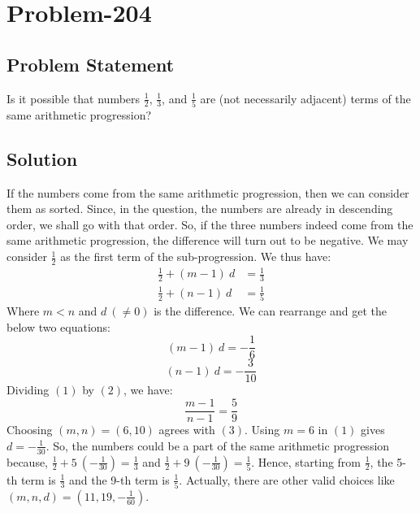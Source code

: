 \documentclass[12pt]{article}
\begin{document}
\section*{Problem-204}
\subsection*{Problem Statement}
Is it possible that numbers $\frac{1}{2}$, $\frac{1}{3}$, and $\frac{1}{5}$ are (not necessarily adjacent) terms of the same arithmetic progression?

\subsection*{Solution}
If the numbers come from the same arithmetic progression, then we can consider them as sorted. Since, in the question, the numbers are already in descending order, we shall go with that order. So, if the three numbers indeed come from the same arithmetic progression, the difference will turn out to be negative. We may consider $\frac{1}{2}$ as the first term of the sub-progression. We thus have:
\begin{equation*}
\begin{aligned}
\frac{1}{2} + (m-1)\ d &= \frac{1}{3}\\
\frac{1}{2} + (n-1)\ d &= \frac{1}{5}
\end{aligned}
\end{equation*}
Where $m < n$ and $d\ (\neq 0)$ is the difference. We can rearrange and get the below two equations:
\begin{equation}
		(m-1)\ d = -\frac{1}{6}	
\end{equation}
\begin{equation}
		(n-1)\ d = -\frac{3}{10}	
\end{equation}
Dividing $(1)$ by $(2)$, we have:
\begin{equation}
	\frac{m-1}{n-1} = \frac{5}{9}
\end{equation}
Choosing $(m, n) = (6, 10)$ agrees with $(3)$. Using $m=6$ in $(1)$ gives $d = -\frac{1}{30}$. So, the numbers could be a part of the same arithmetic progression because, $\frac{1}{2} + 5\ \left( -\frac{1}{30} \right) = \frac{1}{3}$ and $\frac{1}{2} + 9 \ \left( -\frac{1}{30} \right) = \frac{1}{5}$. Hence, starting from $\frac{1}{2}$, the 5-th term is $\frac{1}{3}$ and the 9-th term is $\frac{1}{5}$. Actually, there are other valid choices like $(m, n, d) = \left( 11, 19, -\frac{1}{60} \right)$.
\end{document}

